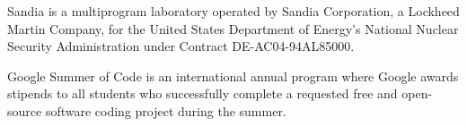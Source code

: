 Sandia is a multiprogram laboratory operated by Sandia Corporation, a Lockheed Martin Company, for the United States Department of Energy's National Nuclear Security Administration under Contract DE-AC04-94AL85000.

Google Summer of Code is an international annual program where Google awards stipends to all students who successfully complete a requested free and open-source software coding project during the summer.
